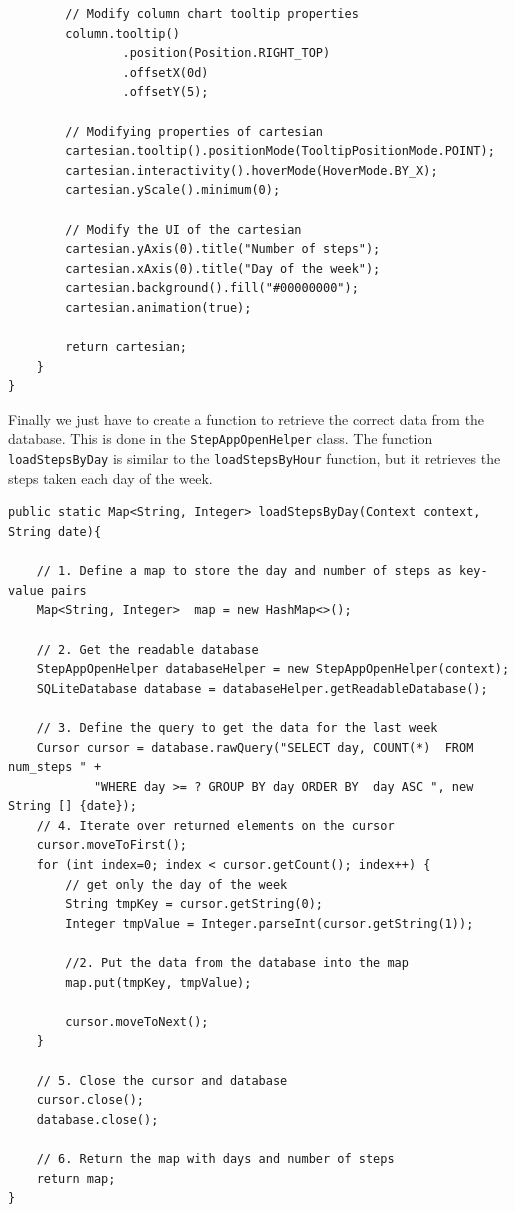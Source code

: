 \documentclass{usireport}
\begin{document}
\begin{verbatim}
        // Modify column chart tooltip properties
        column.tooltip()
                .position(Position.RIGHT_TOP)
                .offsetX(0d)
                .offsetY(5);

        // Modifying properties of cartesian
        cartesian.tooltip().positionMode(TooltipPositionMode.POINT);
        cartesian.interactivity().hoverMode(HoverMode.BY_X);
        cartesian.yScale().minimum(0);

        // Modify the UI of the cartesian
        cartesian.yAxis(0).title("Number of steps");
        cartesian.xAxis(0).title("Day of the week");
        cartesian.background().fill("#00000000");
        cartesian.animation(true);

        return cartesian;
    }
}
\end{verbatim}

Finally we just have to create a function to retrieve the correct data from the database. This is done in the \texttt{StepAppOpenHelper} class. The function \texttt{loadStepsByDay} is similar to the \texttt{loadStepsByHour} function, but it retrieves the steps taken each day of the week.

\begin{verbatim}
public static Map<String, Integer> loadStepsByDay(Context context, String date){

    // 1. Define a map to store the day and number of steps as key-value pairs
    Map<String, Integer>  map = new HashMap<>();

    // 2. Get the readable database
    StepAppOpenHelper databaseHelper = new StepAppOpenHelper(context);
    SQLiteDatabase database = databaseHelper.getReadableDatabase();

    // 3. Define the query to get the data for the last week
    Cursor cursor = database.rawQuery("SELECT day, COUNT(*)  FROM num_steps " +
            "WHERE day >= ? GROUP BY day ORDER BY  day ASC ", new String [] {date});
    // 4. Iterate over returned elements on the cursor
    cursor.moveToFirst();
    for (int index=0; index < cursor.getCount(); index++) {
        // get only the day of the week
        String tmpKey = cursor.getString(0);
        Integer tmpValue = Integer.parseInt(cursor.getString(1));

        //2. Put the data from the database into the map
        map.put(tmpKey, tmpValue);

        cursor.moveToNext();
    }

    // 5. Close the cursor and database
    cursor.close();
    database.close();

    // 6. Return the map with days and number of steps
    return map;
}
\end{verbatim}
\end{document}
